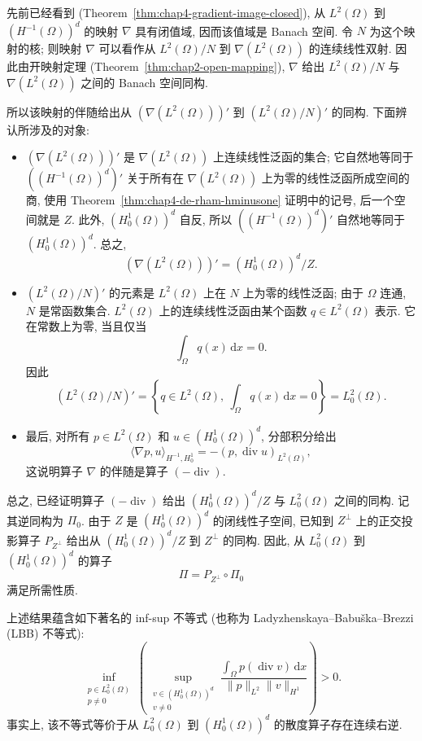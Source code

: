 \begin{Proof}
先前已经看到 (Theorem~\ref{thm:chap4-gradient-image-closed}), 从 $L^2(\Omega)$ 到 $(H^{-1}(\Omega))^d$ 的映射 $\nabla$ 具有闭值域, 因而该值域是 Banach 空间. 令 $N$ 为这个映射的核; 则映射 $\nabla$ 可以看作从 $L^2(\Omega)/N$ 到 $\nabla(L^2(\Omega))$ 的连续线性双射. 因此由开映射定理 (Theorem~\ref{thm:chap2-open-mapping}), $\nabla$ 给出 $L^2(\Omega)/N$ 与 $\nabla(L^2(\Omega))$ 之间的 Banach 空间同构.

所以该映射的伴随给出从 $(\nabla(L^2(\Omega)))'$ 到 $(L^2(\Omega)/N)'$ 的同构. 下面辨认所涉及的对象:
\begin{itemize}
 \item $(\nabla(L^2(\Omega)))'$ 是 $\nabla(L^2(\Omega))$ 上连续线性泛函的集合; 它自然地等同于 $((H^{-1}(\Omega))^d)'$ 关于所有在 $\nabla(L^2(\Omega))$ 上为零的线性泛函所成空间的商, 使用 Theorem~\ref{thm:chap4-de-rham-hminusone} 证明中的记号, 后一个空间就是 $Z$. 此外, $(H_0^1(\Omega))^d$ 自反, 所以 $((H^{-1}(\Omega))^d)'$ 自然地等同于 $(H_0^1(\Omega))^d$. 总之,
 \[
  (\nabla(L^2(\Omega)))'=(H_0^1(\Omega))^d/Z.
 \]

 \item $(L^2(\Omega)/N)'$ 的元素是 $L^2(\Omega)$ 上在 $N$ 上为零的线性泛函; 由于 $\Omega$ 连通, $N$ 是常函数集合. $L^2(\Omega)$ 上的连续线性泛函由某个函数 $q\in L^2(\Omega)$ 表示. 它在常数上为零, 当且仅当
 \[
  \int_\Omega q(x)\,\mathrm dx=0.
 \]
 因此
 \[
  (L^2(\Omega)/N)'
  =\left\{q\in L^2(\Omega),\ \int_\Omega q(x)\,\mathrm dx=0\right\}
  =L_0^2(\Omega).
 \]

 \item 最后, 对所有 $p\in L^2(\Omega)$ 和 $u\in(H_0^1(\Omega))^d$, 分部积分给出
 \[
  \langle\nabla p,u\rangle_{H^{-1},H_0^1}
  =-(p,\operatorname{div}u)_{L^2(\Omega)},
 \]
 这说明算子 $\nabla$ 的伴随是算子 $(-\operatorname{div})$.
\end{itemize}

总之, 已经证明算子 $(-\operatorname{div})$ 给出 $(H_0^1(\Omega))^d/Z$ 与 $L_0^2(\Omega)$ 之间的同构. 记其逆同构为 $\Pi_0$. 由于 $Z$ 是 $(H_0^1(\Omega))^d$ 的闭线性子空间, 已知到 $Z^\perp$ 上的正交投影算子 $P_{Z^\perp}$ 给出从 $(H_0^1(\Omega))^d/Z$ 到 $Z^\perp$ 的同构. 因此, 从 $L_0^2(\Omega)$ 到 $(H_0^1(\Omega))^d$ 的算子
\[
 \Pi=P_{Z^\perp}\circ\Pi_0
\]
满足所需性质.
\end{Proof}

上述结果蕴含如下著名的 inf-sup 不等式 (也称为 Ladyzhenskaya--Babuška--Brezzi (LBB) 不等式):
\[
 \inf_{\substack{p\in L_0^2(\Omega)\\p\neq0}}
 \left(
  \sup_{\substack{v\in(H_0^1(\Omega))^d\\v\neq0}}
  \frac{\displaystyle\int_\Omega p(\operatorname{div}v)\,\mathrm dx}
       {\|p\|_{L^2}\|v\|_{H^1}}
 \right)>0.
\]
事实上, 该不等式等价于从 $L_0^2(\Omega)$ 到 $(H_0^1(\Omega))^d$ 的散度算子存在连续右逆.

